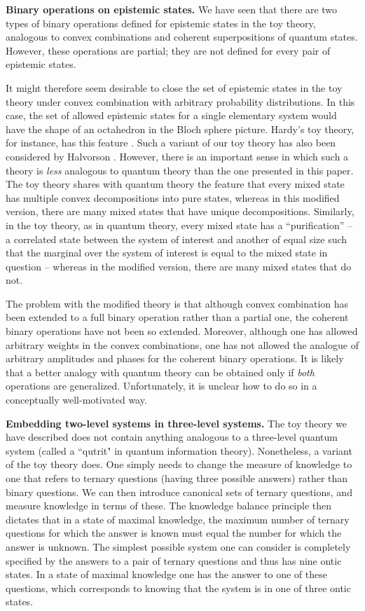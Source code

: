 \documentclass[pra,twocolumn,nofootinbib,showpacs]{revtex4}
\begin{document}
\textbf{Binary operations on epistemic states. }We have seen that there are
two types of binary operations defined for epistemic states in the toy
theory, analogous to convex combinations and coherent superpositions of
quantum states. However, these operations are partial; they are not defined
for every pair of epistemic states.

It might therefore seem desirable to close the set of epistemic states in
the toy theory under convex combination with arbitrary probability
distributions. In this case, the set of allowed epistemic states for a
single elementary system would have the shape of an octahedron in the Bloch
sphere picture. Hardy's toy theory, for instance, has this feature \cite%
{Hardydisentangling}. Such a variant of our toy theory has also
been considered by Halvorson \cite{Halvorson}. However, there is
an important sense in which such a theory is \emph{less} analogous
to quantum theory than the one presented in this paper. The toy
theory shares with quantum theory the feature that every mixed
state has multiple convex decompositions into pure states, whereas
in this modified version, there are many mixed states that have
unique decompositions. Similarly, in the toy theory, as in quantum
theory, every mixed state has a ``purification'' -- a correlated
state between the system of interest and another of equal size
such that the marginal over the system of interest is equal to the
mixed state in question -- whereas in the modified version, there
are many mixed states that do not.

The problem with the modified theory is that although convex
combination has been extended to a full binary operation rather
than a partial one, the coherent binary operations have not been
so extended. Moreover, although one has allowed arbitrary weights
in the convex combinations, one has not allowed the analogue of
arbitrary amplitudes and phases for the coherent binary
operations. It is likely that a better analogy with quantum theory
can be obtained only if \emph{both} operations are generalized.
Unfortunately, it is unclear how to do so in a conceptually
well-motivated way.

\textbf{Embedding two-level systems in three-level systems. }The
toy theory we have described does not contain anything analogous
to a three-level quantum system (called a ``qutrit" in quantum
information theory). Nonetheless, a variant of the toy theory
does. One simply needs to change the measure of knowledge to one
that refers to ternary questions (having three possible answers)
rather than binary questions. We can then introduce canonical sets
of ternary questions, and measure knowledge in terms of these. The
knowledge balance principle then dictates that in a state of
maximal knowledge, the maximum number of ternary questions for
which the answer is known must equal the number for which the
answer is unknown. The simplest possible system one can consider
is completely specified by the answers to a pair of ternary
questions and thus has nine ontic states. In a state of maximal
knowledge one has the answer to one of these questions, which
corresponds to knowing that the system is in one of three ontic
states.
\end{document}
